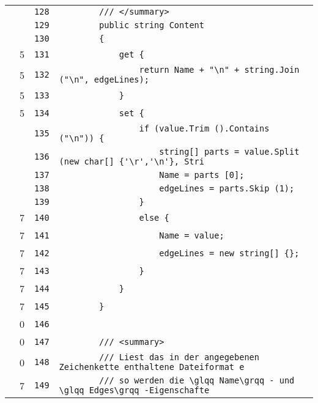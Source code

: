 \documentclass[a4paper,10pt]{article}
\begin{document}
\begin{longtable}[l]{lrrl}
\cellcolor{gray} &  & \verb~128~ & \verb~        /// </summary>~\\
\cellcolor{gray} &  & \verb~129~ & \verb~        public string Content~\\
\cellcolor{gray} &  & \verb~130~ & \verb~        {~\\
\cellcolor{green} & 5 & \verb~131~ & \verb~            get {~\\
\cellcolor{green} & 5 & \verb~132~ & \verb~                return Name + "\n" + string.Join ("\n", edgeLines);~\\
\cellcolor{green} & 5 & \verb~133~ & \verb~            }~\\
\cellcolor{green} & 5 & \verb~134~ & \verb~            set {~\\
\cellcolor{gray} &  & \verb~135~ & \verb~                if (value.Trim ().Contains ("\n")) {~\\
\cellcolor{gray} &  & \verb~136~ & \verb~                    string[] parts = value.Split (new char[] {'\r','\n'}, Stri~\\
\cellcolor{gray} &  & \verb~137~ & \verb~                    Name = parts [0];~\\
\cellcolor{gray} &  & \verb~138~ & \verb~                    edgeLines = parts.Skip (1);~\\
\cellcolor{gray} &  & \verb~139~ & \verb~                }~\\
\cellcolor{green} & 7 & \verb~140~ & \verb~                else {~\\
\cellcolor{green} & 7 & \verb~141~ & \verb~                    Name = value;~\\
\cellcolor{green} & 7 & \verb~142~ & \verb~                    edgeLines = new string[] {};~\\
\cellcolor{green} & 7 & \verb~143~ & \verb~                }~\\
\cellcolor{green} & 7 & \verb~144~ & \verb~            }~\\
\cellcolor{green} & 7 & \verb~145~ & \verb~        }~\\
\cellcolor{red} & 0 & \verb~146~ & \verb~~\\
\cellcolor{red} & 0 & \verb~147~ & \verb~        /// <summary>~\\
\cellcolor{red} & 0 & \verb~148~ & \verb~        /// Liest das in der angegebenen Zeichenkette enthaltene Dateiformat e~\\
\cellcolor{green} & 7 & \verb~149~ & \verb~        /// so werden die \glqq Name\grqq - und \glqq Edges\grqq -Eigenschafte~\\

\end{longtable}
\end{document}
